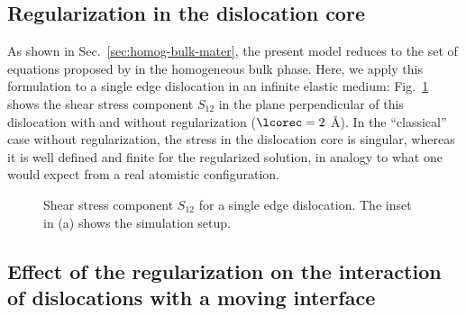 \documentclass[preprint,review,3p,times,authoryear]{elsarticle}
\begin{document}
\subsection{Regularization in the dislocation core}
\label{sec:MB_reg_core}

As shown in Sec.~\ref{sec:homog-bulk-mater}, the present model reduces to the set of equations proposed by \cite{Po:2018} in the homogeneous bulk phase. Here, we apply this formulation to a single edge dislocation in an infinite elastic medium: Fig.~\ref{fig:MB_single_edge} shows the shear stress component $S_{12}$ in the plane perpendicular of this dislocation with and without regularization ($\lcorec = 2$ \AA). In the ``classical'' case without regularization, the stress in the dislocation core is singular, whereas it is well defined and finite for the regularized solution, in analogy to what one would expect from a real atomistic configuration.

\begin{figure}[h]
  \centering
  \hspace{0.1cm}
  \caption{Shear stress component $S_{12}$ for a single edge dislocation. The inset in (a)  shows the simulation setup.}
  \label{fig:MB_single_edge}
\end{figure}

\subsection{Effect of the regularization on the interaction of dislocations with a moving interface}
\label{sec:MB_interaction}
\end{document}
